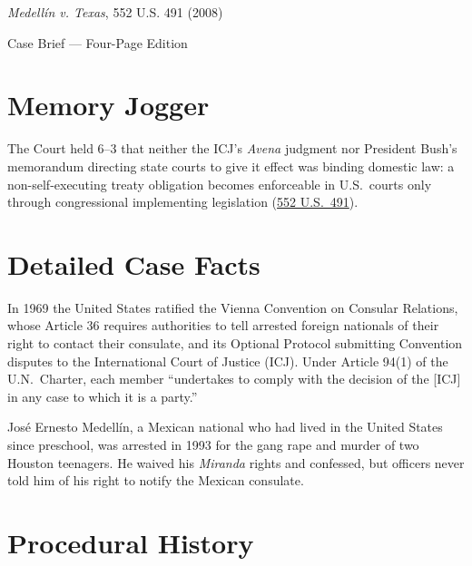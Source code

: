 \documentclass[12pt]{article}
\begin{document}
\begin{center}
{\LARGE \textit{Medell\'{i}n v. Texas}, 552 U.S. 491 (2008)\par}
\vspace{0.8em}
{\large Case Brief --- Four-Page Edition\par}
\end{center}
\vspace{1em}

\section{Memory Jogger}

The Court held 6--3 that neither the ICJ's \textit{Avena} judgment nor President Bush's memorandum directing state courts to give it effect was binding domestic law: a non-self-executing treaty obligation becomes enforceable in U.S.\ courts only through congressional implementing legislation (\href{https://supreme.justia.com/cases/federal/us/552/491/}{552 U.S.\ 491}).

\section{Detailed Case Facts}

In 1969 the United States ratified the Vienna Convention on Consular Relations, whose Article 36 requires authorities to tell arrested foreign nationals of their right to contact their consulate, and its Optional Protocol submitting Convention disputes to the International Court of Justice (ICJ). Under Article 94(1) of the U.N.\ Charter, each member ``undertakes to comply with the decision of the [ICJ] in any case to which it is a party.''

Jos\'{e} Ernesto Medell\'{i}n, a Mexican national who had lived in the United States since preschool, was arrested in 1993 for the gang rape and murder of two Houston teenagers. He waived his \textit{Miranda} rights and confessed, but officers never told him of his right to notify the Mexican consulate.

\section{Procedural History}
\end{document}
